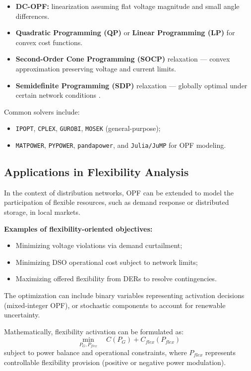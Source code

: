 \documentclass[11pt]{article}
\begin{document}
	\begin{itemize}
		\item \textbf{DC-OPF:} linearization assuming flat voltage magnitude and small angle differences.
		\item \textbf{Quadratic Programming (QP)} or \textbf{Linear Programming (LP)} for convex cost functions.
		\item \textbf{Second-Order Cone Programming (SOCP)} relaxation — convex approximation preserving voltage and current limits.
		\item \textbf{Semidefinite Programming (SDP)} relaxation — globally optimal under certain network conditions \cite{lavaei2012zero}.
	\end{itemize}
	
	Common solvers include:
	\begin{itemize}
		\item \texttt{IPOPT}, \texttt{CPLEX}, \texttt{GUROBI}, \texttt{MOSEK} (general-purpose);
		\item \texttt{MATPOWER}, \texttt{PYPOWER}, \texttt{pandapower}, and \texttt{Julia/JuMP} for OPF modeling.
	\end{itemize}
	
	\subsection{Applications in Flexibility Analysis}
	
	In the context of distribution networks, OPF can be extended to model the participation of flexible resources, such as demand response or distributed storage, in local markets.
	
	\textbf{Examples of flexibility-oriented objectives:}
	\begin{itemize}
		\item Minimizing voltage violations via demand curtailment;
		\item Minimizing DSO operational cost subject to network limits;
		\item Maximizing offered flexibility from DERs to resolve contingencies.
	\end{itemize}
	
	The optimization can include binary variables representing activation decisions (mixed-integer OPF), or stochastic components to account for renewable uncertainty.
	
	Mathematically, flexibility activation can be formulated as:
	\[
	\min_{P_{G}, P_{flex}} \quad C(P_{G}) + C_{flex}(P_{flex})
	\]
	subject to power balance and operational constraints, where $P_{flex}$ represents controllable flexibility provision (positive or negative power modulation).
	
\end{document}
